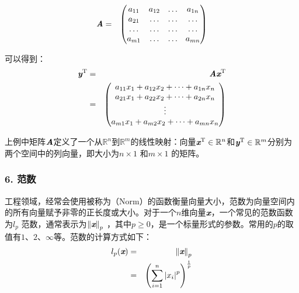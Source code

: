 \begin{eqnarray}
{\textbf{\em A}}&=&
\begin{pmatrix}
   a_{11} & a_{12} & \dots & a_{1n}\\
   a_{21} & \dots & \dots & \dots \\
   \dots & \dots & \dots & \dots \\
   a_{m1} & \dots & \dots & a_{mn}
\end{pmatrix}
\label{eq:9-12}
\end{eqnarray}

\parinterval 可以得到：
\begin{eqnarray}
{\textbf{\em y}}^{\textrm{T}}& = &{\textbf{\em A}}{\textbf{\em x}}^{\textrm{T}} \nonumber \\
               & = &
\begin{pmatrix}
   a_{11}x_{1}+a_{12}x_{2}+\dots+a_{1n}x_{n}\\
   a_{21}x_{1}+a_{22}x_{2}+\dots+a_{2n}x_{n}\\
   \vdots \\
   a_{m1}x_{1}+a_{m2}x_{2}+\dots+a_{mn}x_{n}
\label{eq:9-13}\end{pmatrix}
\end{eqnarray}

\parinterval 上例中矩阵$ {\textbf{\em A}} $定义了一个从$ {\mathbb R}^n $到$ {\mathbb R}^m $的线性映射：向量$ {\textbf{\em x}}^{\textrm{T}}\in {\mathbb R}^n $和$ {\textbf{\em y}}^{\textrm{T}}\in {\mathbb R}^m $分别为两个空间中的列向量，即大小为$ n\times 1 $ 和$ m\times 1 $ 的矩阵。


\subsubsection{6. 范数}

\parinterval 工程领域，经常会使用被称为{\small{}}（Norm）的函数衡量向量大小，范数为向量空间内的所有向量赋予非零的正长度或大小。对于一个$n$维向量$ {\textbf{\em x}} $，一个常见的范数函数为$ l_p $ 范数，通常表示为$ {\Vert{\textbf{\em x}}\Vert}_p $ ，其中$p\ge 0$，是一个标量形式的参数。常用的$ p $的取值有$ 1 $、$ 2 $、$ \infty $等。范数的计算方式如下：
\begin{eqnarray}
l_p({\textbf{\em x}}) & = & {\Vert{\textbf{\em x}}\Vert}_p \nonumber \\
               & = & {\left (\sum_{i=1}^{n}{{\vert x_{i}\vert}^p}\right )}^{\frac{1}{p}}
\label{eq:9-14}
\end{eqnarray}

